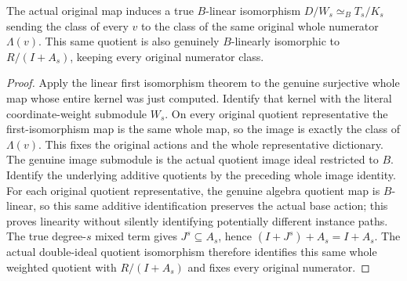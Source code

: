\begin{theorem}
\label{hir:relative-normal-actual-weighted-whole-quotient-equivalence}
\leanok
The actual original map induces a true $B$-linear isomorphism
$D/W_s\simeq_B T_s/K_s$ sending the class of every $v$ to the class
of the same original whole numerator $\Lambda(v)$. This same quotient
is also genuinely $B$-linearly isomorphic to $R/(I+A_s)$, keeping
every original numerator class.
\end{theorem}
\begin{proof}
Apply the linear first isomorphism theorem to the genuine surjective
whole map whose entire kernel was just computed. Identify that kernel
with the literal coordinate-weight submodule $W_s$. On every original
quotient representative the first-isomorphism map is the same whole
map, so the image is exactly the class of $\Lambda(v)$. This fixes the
original actions and the whole representative dictionary. The genuine
image submodule is the actual quotient image ideal restricted to $B$.
Identify the underlying additive quotients by the preceding whole image
identity. For each original quotient representative, the genuine algebra
quotient map is $B$-linear, so this same additive identification preserves
the actual base action; this proves linearity without silently identifying
potentially different instance paths. The true degree-$s$ mixed term gives
$J^s\subseteq A_s$, hence $(I+J^s)+A_s=I+A_s$. The actual double-ideal
quotient isomorphism therefore identifies this same whole weighted quotient
with $R/(I+A_s)$ and fixes every original numerator.
\end{proof}


